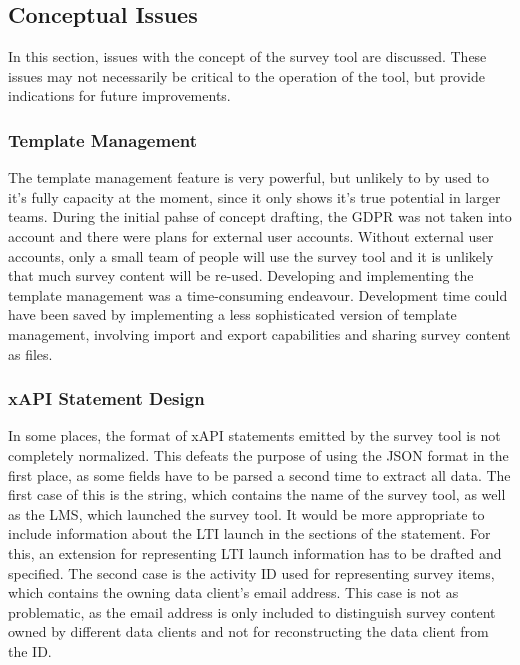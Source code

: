     \subsection{Conceptual Issues}
    	In this section, issues with the concept of the survey tool are discussed.
    	These issues may not necessarily be critical to the operation of the tool,
    	but provide indications for future improvements.

    	\subsubsection{Template Management}
    		The template management feature is very powerful, but unlikely to
    		by used to it's fully capacity at the moment, since it only
    		shows it's true potential in larger teams. During the initial
    		pahse of concept drafting, the GDPR was not taken into account
    		and there were plans for external user accounts. Without
    		external user accounts, only a small team of people will
    		use the survey tool and it is unlikely that much survey content
    		will be re-used. Developing and implementing the template
    		management was a time-consuming endeavour. Development
    		time could have been saved by implementing a less sophisticated
    		version of template management, involving import and export
    		capabilities and sharing survey content as files.

	   	\subsubsection{xAPI Statement Design}
	   		In some places, the format of xAPI statements emitted by
	   		the survey tool is not completely normalized. This defeats
	   		the purpose of using the JSON format in the first place,
	   		as some fields have to be parsed a second time to extract all
	   		data. The first case of this is the  string,
	   		which contains the name of the survey tool, as well as the
	   		LMS, which launched the survey tool. It would be more appropriate
	   		to include information about the LTI launch in the
	   		 sections of the statement. For this,
	   		an extension for representing LTI launch information
	   		has to be drafted and specified.
	   		The second case is the activity ID used for representing
	   		survey items, which contains the owning data client's
	   		email address. This case is not as problematic, as the
	   		email address is only included to distinguish survey
	   		content owned by different data clients and not for
	   		reconstructing the data client from the ID.

